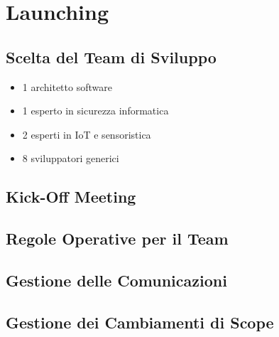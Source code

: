\chapter{Launching}

\section{Scelta del Team di Sviluppo}

\begin{itemize}
    \item 1 architetto software
    \item 1 esperto in sicurezza informatica
    \item 2 esperti in IoT e sensoristica
    \item 8 sviluppatori generici
\end{itemize}

\section{Kick-Off Meeting}

\section{Regole Operative per il Team}

\section{Gestione delle Comunicazioni}

\section{Gestione dei Cambiamenti di Scope}

